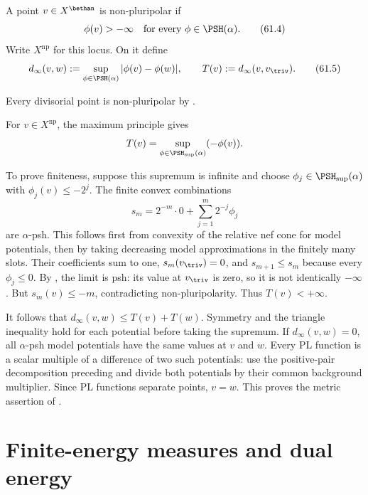 \begin{definition}
\label{def:mpwn-nonpluripolar-point}
A point $v\in X^{\bethan}$ is non-pluripolar if
\[
             \phi(v)>-\infty\quad\text{for every }\phi\in\PSH(\alpha).
\tag{61.4}\label{eq:mpwn-nonpluripolar}
\]
Write $X^{\mathrm{np}}$ for this locus.  On it define
\[
 d_\infty(v,w)
   :=\sup_{\phi\in\PSH(\alpha)}
       |\phi(v)-\phi(w)|,
\qquad
 T(v):=d_\infty(v,v_{\triv}).
\tag{61.5}\label{eq:mpwn-dinfty}
\]
\end{definition}

Every divisorial point is non-pluripolar by
.
\par\noindent\begin{minipage}{\linewidth}
For $v\in X^{\mathrm{np}}$, the maximum principle gives
\[
            T(v)=\sup_{\phi\in\PSH_{\sup}(\alpha)}(-\phi(v)).
\]
\end{minipage}\par
To prove finiteness, suppose this supremum is infinite and choose
$\phi_j\in\PSH_{\sup}(\alpha)$ with $\phi_j(v)\leq-2^j$.
The finite convex combinations
\[
       s_m=2^{-m}\cdot0+\sum_{j=1}^m2^{-j}\phi_j
\]
are $\alpha$-psh.  This follows first from convexity of the
relative nef cone for model potentials, then by taking decreasing
model approximations in the finitely many slots.
Their coefficients sum to one, $s_m(v_{\triv})=0$, and
$s_{m+1}\leq s_m$ because every $\phi_j\leq0$.
By , the limit is psh:
its value at $v_{\triv}$ is zero, so it is not identically
$-\infty$.  But $s_m(v)\leq-m$, contradicting non-pluripolarity.
Thus $T(v)<+\infty$.

It follows that $d_\infty(v,w)\leq T(v)+T(w)$.
Symmetry and the triangle inequality hold for each potential
before taking the supremum.  If $d_\infty(v,w)=0$, all
$\alpha$-psh model potentials have the same values at $v$ and $w$.
Every PL function is a scalar multiple of a difference of two
such potentials: use the positive-pair decomposition preceding
 and divide both potentials by
their common background multiplier.
Since PL functions separate points, $v=w$.
This proves the metric assertion of
\cite[Proposition~3.2.2]{MPWN25}.

\section{Finite-energy measures and dual energy}
\label{sec:mpwn-dual-energy}

